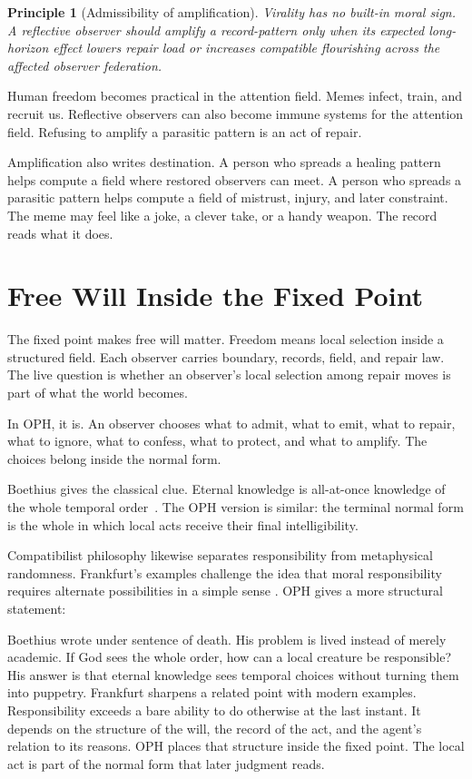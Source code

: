 \documentclass[11pt]{article}
\newtheorem{principle}[definition]{Principle}
\theoremstyle{remark}
\theoremstyle{plain}
\begin{document}
\begin{principle}[Admissibility of amplification]
Virality has no built-in moral sign. A reflective observer should amplify a
record-pattern only when its expected long-horizon effect lowers repair load or
increases compatible flourishing across the affected observer federation.
\end{principle}

Human freedom becomes practical in the attention field. Memes infect, train, and
recruit us. Reflective observers can also become immune systems for the
attention field. Refusing to amplify a parasitic pattern is an act of repair.

Amplification also writes destination. A person who spreads a healing pattern
helps compute a field where restored observers can meet. A person who spreads a
parasitic pattern helps compute a field of mistrust, injury, and later
constraint. The meme may feel like a joke, a clever take, or a handy weapon.
The record reads what it does.

\section{Free Will Inside the Fixed Point}

The fixed point makes free will matter. Freedom means local selection inside a
structured field. Each observer carries boundary, records, field, and repair
law. The live question is whether an observer's local selection among repair
moves is part of what the world becomes.

In OPH, it is. An observer chooses what to admit, what to emit, what to repair,
what to ignore, what to confess, what to protect, and what to amplify. The
choices belong inside the normal form.

Boethius gives the classical clue. Eternal knowledge is all-at-once knowledge of
the whole temporal order~\cite{BoethiusConsolation,SEPForeknowledge}. The OPH version is similar: the
terminal normal form is the whole in which local acts receive their final
intelligibility.

Compatibilist philosophy likewise separates responsibility from metaphysical
randomness. Frankfurt's examples challenge the idea that moral responsibility
requires alternate possibilities in a simple sense
\cite{Frankfurt1969,SEPCompatibilism}. OPH gives a more structural statement:

Boethius wrote under sentence of death. His problem is lived instead of merely
academic. If God sees the whole order, how can a local creature be
responsible? His answer is that eternal knowledge sees temporal choices without
turning them into puppetry. Frankfurt sharpens a related point with modern
examples. Responsibility exceeds a bare ability to do otherwise at the last
instant. It depends on the structure of the will, the record of the
act, and the agent's relation to its reasons. OPH places that structure inside
the fixed point. The local act is part of the normal form that later judgment
reads.
\end{document}
